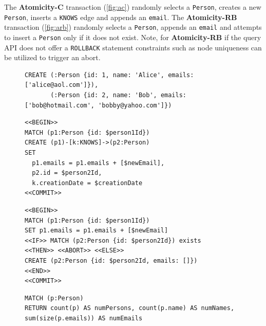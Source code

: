 The \textbf{Atomicity-C} transaction (\autoref{fig:ac}) randomly selects a \texttt{Person}, creates a new \texttt{Person}, inserts a \texttt{KNOWS} edge and appends an \texttt{email}. The \textbf{Atomicity-RB} transaction (\autoref{fig:arb}) randomly selects a \texttt{Person}, appends an \texttt{email} and attempts to insert a \texttt{Person} only if it does not exist.
Note, for \textbf{Atomicity-RB} if the query API does not offer a \texttt{ROLLBACK} statement constraints such as node uniqueness can be utilized to trigger an abort.

\begin{figure}[htb]
\centering

\begin{lstlisting}[language=cypher,label=fig:ainitial,caption=Cypher query for creating initial data for the \tx{Atomicity} transactions.]
CREATE (:Person {id: 1, name: 'Alice', emails: ['alice@aol.com']}),
       (:Person {id: 2, name: 'Bob', emails: ['bob@hotmail.com', 'bobby@yahoo.com']})
\end{lstlisting}

\begin{minipage}{0.41\linewidth}
\begin{lstlisting}[language=cypher,label=fig:ac,caption=\tx{Atomicity-C Tx.}]
<<BEGIN>>
MATCH (p1:Person {id: $person1Id})
CREATE (p1)-[k:KNOWS]->(p2:Person)
SET
  p1.emails = p1.emails + [$newEmail],
  p2.id = $person2Id,
  k.creationDate = $creationDate
<<COMMIT>>
\end{lstlisting}
\end{minipage}
\quad
\begin{minipage}{0.52\linewidth}
\begin{lstlisting}[language=cypher,label=fig:arb,caption=\tx{Atomicity-RB Tx.}]
<<BEGIN>>
MATCH (p1:Person {id: $person1Id})
SET p1.emails = p1.emails + [$newEmail]
<<IF>> MATCH (p2:Person {id: $person2Id}) exists
<<THEN>> <<ABORT>> <<ELSE>>
CREATE (p2:Person {id: $person2Id, emails: []})
<<END>>
<<COMMIT>>
\end{lstlisting}
\end{minipage}

\begin{lstlisting}[language=cypher,label=fig:acheck,caption=\tx{Atomicity-C/Atomicity-RB:} counting entities in the graph.]
MATCH (p:Person)
RETURN count(p) AS numPersons, count(p.name) AS numNames, sum(size(p.emails)) AS numEmails
\end{lstlisting}
\end{figure}

